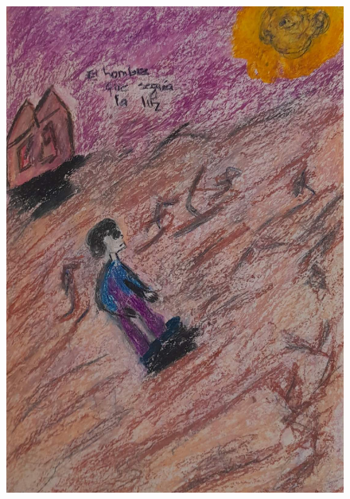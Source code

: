 \documentclass[12pt, a4paper, twoside]{book} %
\begin{document}
\begin{figure}[H]
	\centering
	\includegraphics[width=\textwidth]{./images/1f81324dd99091.jpg}
\end{figure}

\clearpage
\end{document}
